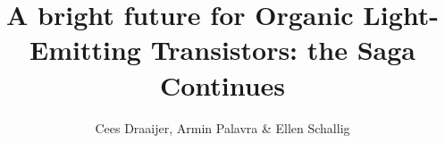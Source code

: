 \documentclass[a4paper,11pt]{article}
\title{A bright future for Organic Light-Emitting Transistors: the Saga Continues}
\author{Cees Draaijer, Armin Palavra \& Ellen Schallig}
\begin{document}
\maketitle

\begin{abstract}

\end{abstract}






\end{document}
